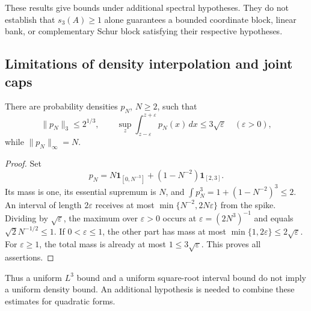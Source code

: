 These results give bounds under additional spectral hypotheses.
They do not establish that $s_3(A)\ge1$ alone guarantees a bounded
coordinate block, linear bank, or complementary Schur block satisfying
their respective hypotheses.

\subsection{Limitations of density interpolation and joint caps}

\begin{proposition}
\label{supp:interpolation-obstruction}
There are probability densities $p_N$, $N\ge2$, such that
\[
 \|p_N\|_3\le2^{1/3},\qquad
 \sup_z\int_{z-\varepsilon}^{z+\varepsilon}p_N(x)\,dx
        \le3\sqrt\varepsilon\quad(\varepsilon>0),
\]
while $\|p_N\|_\infty=N$.
\end{proposition}
\begin{proof}
Set
\[
 p_N=N\mathbf1_{[0,N^{-3}]}
                +(1-N^{-2})\mathbf1_{[2,3]}.
\]
Its mass is one, its essential supremum is $N$, and
$\int p_N^3=1+(1-N^{-2})^3\le2$.
An interval of length $2\varepsilon$ receives at most
$\min\{N^{-2},2N\varepsilon\}$ from the spike.  Dividing by
$\sqrt\varepsilon$, the maximum over $\varepsilon>0$ occurs
at $\varepsilon=(2N^3)^{-1}$ and equals
$\sqrt2N^{-1/2}\le1$.  If $0<\varepsilon\le1$, the other
part has mass at most $\min\{1,2\varepsilon\}\le2\sqrt\varepsilon$.
For $\varepsilon\ge1$, the total mass is already at most
$1\le3\sqrt\varepsilon$.  This proves all assertions.
\end{proof}

Thus a uniform $L^3$ bound and a uniform square-root interval bound
do not imply a uniform density bound.  An additional hypothesis is
needed to combine these estimates for quadratic forms.

